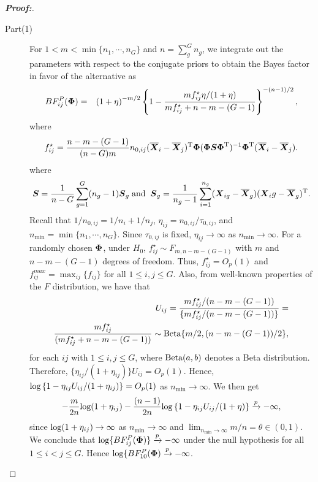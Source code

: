 \documentclass[12pt]{article}
\theoremstyle{plain}%
\theoremstyle{definition}
\def\log{\hbox{log}}
\def\Beta{\hbox{Beta}}
\def\log{\hbox{log}}
\def\Beta{\hbox{Beta}}
\def\bse{\begin{eqnarray*}}
\def\ese{\end{eqnarray*}}
\def\be{\begin{eqnarray}}
\def\ee{\end{eqnarray}}
\def\trans{^{\rm T}}
\newcommand{\uS}       {\mbox{\boldmath$S$}}
\newcommand{\uX}       {\mbox{\boldmath$X$}}
\newcommand{\uPhi}              {\mbox{\boldmath$\Phi$}}
\begin{document}
\begin{proof}[\textbf{\upshape Proof:}]
\begin{description}
\item[Part(1)]
For $1 < m < \min\{ n_1, \cdots, n_{G} \}$ and $n = \sum^{G}_{g}n_g$, we integrate out the parameters with respect to the conjugate priors to obtain the Bayes factor in favor of the alternative as
\be
BF^{P}_{ij}(\uPhi) &=&\left(1 + \eta \right)^{-m/2} \left\{ 1 -  \frac{ m f_{ij}^{\star} \eta/(1 + \eta) }{ m f_{ij}^{\star}  + n - m - (G-1)} \right\}^{-(n-1)/2} \nonumber,
\ee
where
\bse
f_{ij}^{\star}  = \frac{n - m - (G-1)}{(n-G)m} n_{0,ij}(\overline{\uX}_i - \overline{\uX}_j)\trans \uPhi(\uPhi \uS\uPhi\trans )^{-1}\uPhi\trans (\overline{\uX}_i - \overline{\uX}_j).
\ese
where $$ \uS = \frac{1}{n - G} \sum^{G}_{g=1}(n_g -1)\uS_{g}\; \text{and} \;\; \uS_g = \frac{1}{n_g - 1}\sum^{n_g}_{i=1}(\uX_{ig} - \overline{\uX}_{g})(\uX_ig - \overline{\uX}_{g})\trans.$$
Recall that $1/n_{0,ij} = 1/n_i + 1/n_j$, $\eta_{ij} = n_{0,ij}/\tau_{0,ij}$, and $n_{\min} = \min\{n_1, \cdots, n_G\}$.
Since $\tau_{0,ij}$ is fixed, $\eta_{ij} \rightarrow \infty$ as $n_{\min} \to \infty$.
For a randomly chosen $\uPhi$, under $H_{0}$, $f_{ij}^{\star}  \sim F_{m, n-m-(G-1)}$ with $m$ and $n - m -(G-1)$ degrees of freedom.
Thus, $f_{ij}^{\star} = O_{p}(1)$ and $f^{max}_{ij} = \max_{ij}\{ f_{ij}\}$ for all $1 \leq i, j \leq G$.
Also, from well-known properties of the $F$ distribution, we have that
\bse
U_{ij} = \frac{m f_{ij}^{\star}/(n-m-(G-1) )}{\{m f_{ij}^{\star}/(n-m- (G-1) )\}} = \nonumber \\
  \frac{m f_{ij}^{\star}}{( m f_{ij}^{\star} +n-m- (G-1))} \sim \Beta\{m/2, (n-m-(G-1))/2 \},
\ese
for each $ij$ with $1 \leq i, j \leq G$, where $\Beta(a, b)$ denotes a Beta distribution.
Therefore, $\{\eta_{ij}/(1 + \eta_{ij})\} U_{ij} = O_{p}(1)$.
Hence, $\log\left\{ 1 -  \eta_{ij} U_{ij}/(1 + \eta_{ij}) \right\} = O_{p}(1)$ as $n_{\min} \to \infty$. We then get
\bse
-\frac{m}{2n}\log(1 + \eta_{ij}) -\frac{(n-1)}{2n}\log\left\{ 1 -  \eta_{ij} U_{ij}/(1 + \eta) \right\} \xrightarrow[]{p} -\infty,
\ese
since $\log(1 + \eta_{ij}) \rightarrow \infty$ as $n_{\min} \rightarrow \infty$ and $\lim_{n_{\min} \rightarrow \infty} m/n = \theta \in (0, 1)$.
We conclude that $\log\{BF^{P}_{ij}(\uPhi)\} \xrightarrow[]{p} -\infty$ under the null hypothesis for all $1 \leq i < j \leq G$.
Hence $\log\{BF^{P}_{10}(\uPhi) \xrightarrow[]{p} -\infty$.


\end{description}
\end{proof}
\end{document}
